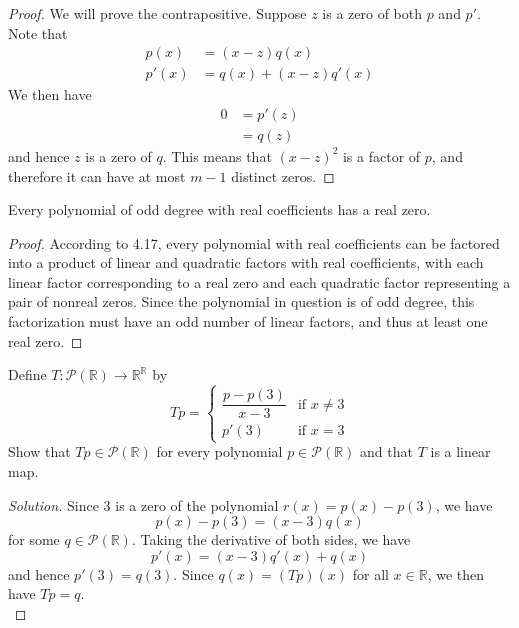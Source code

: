 \documentclass[12pt]{article}
\newenvironment{problem}[2][Problem]{\begin{trivlist}
\item[\hskip \labelsep {\bfseries #1}\hskip \labelsep {\bfseries #2.}]}{\end{trivlist}}
\newenvironment{solution}
  {\renewcommand\qedsymbol{$\blacksquare$}\begin{proof}[Solution]}
{\end{proof}}
\begin{document}
\begin{proof}
  We will prove the contrapositive.
  Suppose $z$ is a zero of both $p$ and $p'$.
  Note that
  \begin{align*}
    p(x) &= (x-z)q(x)\\
    p'(x) &= q(x) + (x-z)q'(x)
  \end{align*}
  We then have
  \begin{align*}
    0 &= p'(z) \\
    &= q(z)
  \end{align*}
  and hence $z$ is a zero of $q$. 
  This means that $(x-z)^2$ is a factor of $p$, and therefore it can have at most $m-1$ distinct zeros.
\end{proof}
\begin{problem}{7}
  Every polynomial of odd degree with real coefficients has a real zero.
\end{problem}
\begin{proof}
  According to 4.17, every polynomial with real coefficients can be factored into a product of linear
  and quadratic factors with real coefficients, with each linear factor corresponding to a real zero
  and each quadratic factor representing a pair of nonreal zeros. Since the polynomial in question is
  of odd degree, this factorization must have an odd number of linear factors, and thus at least one
  real zero.
\end{proof}
\begin{problem}{8}
  Define $T : \mathcal{P}(\mathbb{R}) \to \mathbb{R}^\mathbb{R}$ by
  \begin{equation*}
    Tp = \begin{cases}
      \dfrac{p-p(3)}{x-3} & \text{if  } x\neq 3 \\
      p'(3) & \text{if  } x = 3
    \end{cases}
  \end{equation*}
  Show that $Tp\in \mathcal{P}(\mathbb{R})$ for every polynomial $p\in\mathcal{P}(\mathbb{R})$ and that
  $T$ is a linear map.
\end{problem}
\begin{solution}
  Since $3$ is a zero of the polynomial $r(x) = p(x) - p(3)$, we have
  \begin{equation*}
    p(x) - p(3) = (x-3)q(x)
  \end{equation*}
  for some $q\in\mathcal{P}(\mathbb{R})$.
  Taking the derivative of both sides, we have
  \begin{equation*}
    p'(x) = (x-3)q'(x) + q(x)
  \end{equation*}
  and hence $p'(3) = q(3)$.
  Since $q(x) = (Tp)(x)$ for all $x\in\mathbb{R}$, we then have $Tp=q$.\\
\end{solution}
\end{document}
